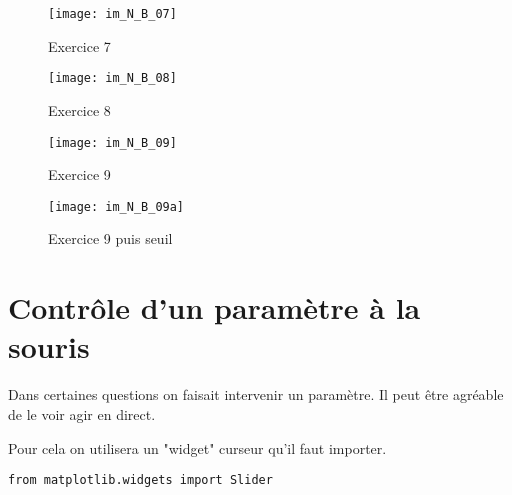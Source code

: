 \begin{figure}[!h]
\centering
\begin{minipage}{0.45\textwidth}
\centering
\texttt{[image: im\_N\_B\_07]}
\caption{Exercice 7}
\end{minipage}\hfill
\begin{minipage}{0.45\textwidth}
\centering
\texttt{[image: im\_N\_B\_08]}
\caption{Exercice 8}
\end{minipage}
\end{figure}
\begin{figure}[!h]
\centering
\begin{minipage}{0.45\textwidth}
\centering
\texttt{[image: im\_N\_B\_09]}
\caption{Exercice 9}
\end{minipage}\hfill
\begin{minipage}{0.45\textwidth}
\centering
\texttt{[image: im\_N\_B\_09a]}
\caption{Exercice 9 puis seuil}
\end{minipage}
\end{figure}
\newpage
\section{Contrôle d'un paramètre à la souris}
Dans certaines questions on faisait intervenir un paramètre. Il peut être agréable de le voir agir en direct.

Pour cela on utilisera un "widget" curseur qu'il faut importer.
\begin{lstlisting}
from matplotlib.widgets import Slider
\end{lstlisting}



